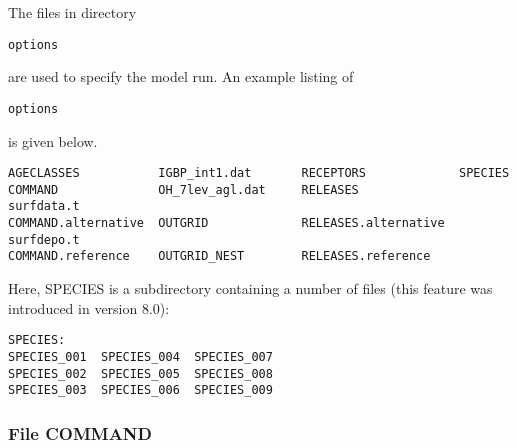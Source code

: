 \documentclass{egu}                  %
\begin{document}
The files in directory \begin{footnotesize}\verb|options|\end{footnotesize} are used to specify the model run.
An example listing of \begin{footnotesize}\verb|options|\end{footnotesize} is given below.
\begin{footnotesize}\begin{verbatim}
AGECLASSES           IGBP_int1.dat       RECEPTORS             SPECIES
COMMAND              OH_7lev_agl.dat     RELEASES              surfdata.t
COMMAND.alternative  OUTGRID             RELEASES.alternative  surfdepo.t
COMMAND.reference    OUTGRID_NEST        RELEASES.reference              
\end{verbatim}\end{footnotesize}

Here, SPECIES is a subdirectory containing a number of files (this feature was introduced in version 8.0):
\begin{footnotesize}\begin{verbatim}
SPECIES:
SPECIES_001  SPECIES_004  SPECIES_007
SPECIES_002  SPECIES_005  SPECIES_008
SPECIES_003  SPECIES_006  SPECIES_009
\end{verbatim}\end{footnotesize}

\subsubsection{File COMMAND}
\end{document}
